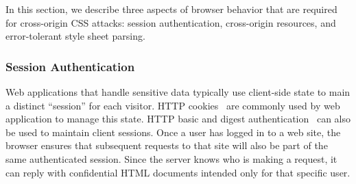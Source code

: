 \documentclass{acm_proc_article-sp}
\begin{document}
In this section, we describe three aspects of browser behavior that are required for cross-origin CSS attacks: session authentication, cross-origin resources, and error-tolerant style sheet parsing.

\subsubsection{Session Authentication}
Web applications that handle sensitive data typically use client-side state to
main a distinct ``session'' for each visitor. HTTP cookies~\cite{rfc2109,
httpstate} are commonly used by web application to manage this state. HTTP
basic and digest authentication~\cite{rfc2617} can also be used to maintain
client sessions. Once a user has logged in to a web site, the browser ensures
that subsequent requests to that site will also be part of the same
authenticated session. Since the server knows who is making a request, it can
reply with confidential HTML documents intended only for that specific user.



% 
% 
% 
% 
% 
% 

% 
\end{document}
